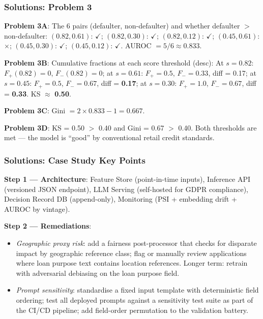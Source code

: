 \documentclass[9pt,t]{beamer}
\begin{document}
\begin{frame}
\frametitle{Solutions: Problem 3}

\textbf{Problem 3A}: The 6 pairs (defaulter, non-defaulter) and whether defaulter $>$ non-defaulter:
$(0.82, 0.61)$: $\checkmark$; $(0.82, 0.30)$: $\checkmark$; $(0.82, 0.12)$: $\checkmark$; $(0.45, 0.61)$: $\times$; $(0.45, 0.30)$: $\checkmark$; $(0.45, 0.12)$: $\checkmark$.
AUROC $= 5/6 \approx 0.833$.

\textbf{Problem 3B}: Cumulative fractions at each score threshold (desc):
At $s=0.82$: $F_+(0.82)=0$, $F_-(0.82)=0$; at $s=0.61$: $F_+=0.5$, $F_-=0.33$, diff = 0.17; at $s=0.45$: $F_+=0.5$, $F_-=0.67$, diff = \textbf{0.17}; at $s=0.30$: $F_+=1.0$, $F_-=0.67$, diff = \textbf{0.33}.
KS $\approx$ \textbf{0.50}.

\textbf{Problem 3C}: Gini $= 2 \times 0.833 - 1 = \mathbf{0.667}$.

\textbf{Problem 3D}: KS = 0.50 $>$ 0.40 and Gini = 0.67 $>$ 0.40. Both thresholds are met --- the model is ``good'' by conventional retail credit standards.
\end{frame}

\begin{frame}
\frametitle{Solutions: Case Study Key Points}

\textbf{Step 1 — Architecture}: Feature Store (point-in-time inputs), Inference API (versioned JSON endpoint), LLM Serving (self-hosted for GDPR compliance), Decision Record DB (append-only), Monitoring (PSI + embedding drift + AUROC by vintage).

\medskip
\textbf{Step 2 — Remediations}:
\begin{itemize}
  \item \textit{Geographic proxy risk}: add a fairness post-processor that checks for disparate impact by geographic reference class; flag or manually review applications where loan purpose text contains location references. Longer term: retrain with adversarial debiasing on the loan purpose field.
  \item \textit{Prompt sensitivity}: standardise a fixed input template with deterministic field ordering; test all deployed prompts against a sensitivity test suite as part of the CI/CD pipeline; add field-order permutation to the validation battery.
\end{itemize}
\end{frame}
\end{document}
